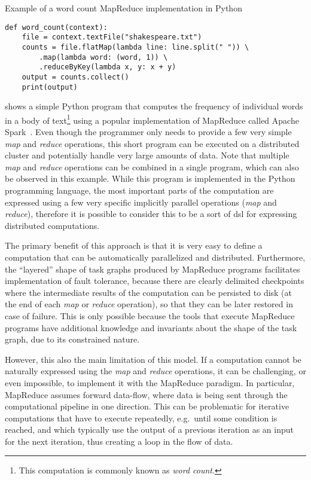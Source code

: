 \begin{listing}
	\caption{Example of a word count MapReduce implementation in Python}
	\label{lst:wordcount-example}
	\begin{verbatim}
def word_count(context):
	file = context.textFile("shakespeare.txt")
	counts = file.flatMap(lambda line: line.split(" ")) \
		.map(lambda word: (word, 1)) \
		.reduceByKey(lambda x, y: x + y)
	output = counts.collect()
	print(output)
	\end{verbatim}
\end{listing}

 shows a simple Python program that computes the frequency of
individual words in a body of text\footnote{This computation is commonly known as \emph{word count}.} using a popular implementation of
MapReduce called Apache Spark~\cite{spark}. Even though the programmer only needs to
provide a few very simple \emph{map} and \emph{reduce} operations, this
short program can be executed on a distributed cluster and potentially handle very large amounts of
data. Note that multiple \emph{map} and \emph{reduce} operations can be
combined in a single program, which can also be observed in this example. While this program is
implemented in the Python programming language, the most important parts of the computation are
expressed using a few very specific implicitly parallel operations (\emph{map} and
\emph{reduce}), therefore it is possible to consider this to be a sort of
\gls{dsl} for expressing distributed computations.

The primary benefit of this approach is that it is very easy to define a computation that can be
automatically parallelized and distributed. Furthermore, the ``layered'' shape of task graphs
produced by MapReduce programs facilitates implementation of fault tolerance, because there are
clearly delimited checkpoints where the intermediate results of the computation can be persisted to
disk (at the end of each \emph{map} or \emph{reduce} operation), so that
they can be later restored in case of failure. This is only possible because the tools that execute
MapReduce programs have additional knowledge and invariants about the shape of the task graph, due
to its constrained nature.

However, this also the main limitation of this model. If a computation cannot be naturally
expressed using the \emph{map} and \emph{reduce} operations, it can be
challenging, or even impossible, to implement it with the MapReduce paradigm. In particular,
MapReduce assumes forward data-flow, where data is being sent through the computational pipeline in
one direction. This can be problematic for iterative computations that have to execute repeatedly,
e.g.\ until some condition is reached, and which typically use the output of a previous iteration
as an input for the next iteration, thus creating a loop in the flow of data.


